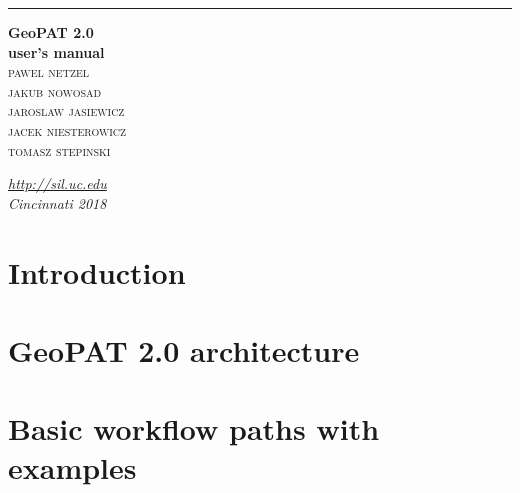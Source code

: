 \documentclass[a4paper, 11pt]{book}
\begin{document}
\begin{titlepage} 
	
	\raggedleft %
	
	\rule{1pt}{\textheight} %
	\hspace{0.05\textwidth} %
	\parbox[b]{0.75\textwidth}{ %
		
		{\Huge\bfseries GeoPAT 2.0 \\[0.5\baselineskip] user's manual}\\[2\baselineskip] %
		{\Large\textsc{pawel netzel}}\\ %
		{\Large\textsc{jakub nowosad}}\\ %
		{\Large\textsc{jaroslaw jasiewicz}}\\ %
		{\Large\textsc{jacek niesterowicz}}\\ %
		{\Large\textsc{tomasz stepinski}} %

		\vspace{0.5\textheight} %
		{\large\textit{\url{http://sil.uc.edu}}}\\
		{\large\textit{Cincinnati 2018}}\\
	}

\end{titlepage}

\newpage

\tableofcontents
\newpage

\chapter{Introduction}


\chapter{GeoPAT 2.0 architecture}


\chapter{Basic workflow paths with examples}

\end{document}
